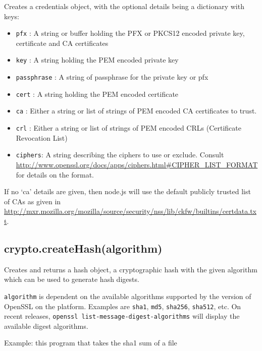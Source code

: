 Creates a credentials object, with the optional details being a
dictionary with keys:

\begin{itemize}
\itemsep1pt\parskip0pt
\item
  \texttt{pfx} : A string or buffer holding the PFX or PKCS12 encoded
  private key, certificate and CA certificates
\item
  \texttt{key} : A string holding the PEM encoded private key
\item
  \texttt{passphrase} : A string of passphrase for the private key or
  pfx
\item
  \texttt{cert} : A string holding the PEM encoded certificate
\item
  \texttt{ca} : Either a string or list of strings of PEM encoded CA
  certificates to trust.
\item
  \texttt{crl} : Either a string or list of strings of PEM encoded CRLs
  (Certificate Revocation List)
\item
  \texttt{ciphers}: A string describing the ciphers to use or exclude.
  Consult
  \url{http://www.openssl.org/docs/apps/ciphers.html\#CIPHER_LIST_FORMAT}
  for details on the format.
\end{itemize}

If no `ca' details are given, then node.js will use the default publicly
trusted list of CAs as given in
\url{http://mxr.mozilla.org/mozilla/source/security/nss/lib/ckfw/builtins/certdata.txt}.

\subsection{crypto.createHash(algorithm)}\label{crypto.createhashalgorithm}

Creates and returns a hash object, a cryptographic hash with the given
algorithm which can be used to generate hash digests.

\texttt{algorithm} is dependent on the available algorithms supported by
the version of OpenSSL on the platform. Examples are
\texttt{\textquotesingle{}sha1\textquotesingle{}},
\texttt{\textquotesingle{}md5\textquotesingle{}},
\texttt{\textquotesingle{}sha256\textquotesingle{}},
\texttt{\textquotesingle{}sha512\textquotesingle{}}, etc. On recent
releases, \texttt{openssl\ list-message-digest-algorithms} will display
the available digest algorithms.

Example: this program that takes the sha1 sum of a file

